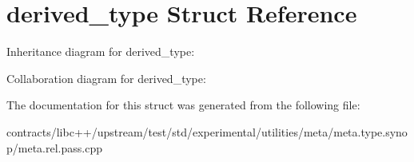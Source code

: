 \hypertarget{structderived__type}{}\section{derived\+\_\+type Struct Reference}
\label{structderived__type}


Inheritance diagram for derived\+\_\+type\+:


Collaboration diagram for derived\+\_\+type\+:


The documentation for this struct was generated from the following file\+:\begin{DoxyCompactItemize}
\item 
contracts/libc++/upstream/test/std/experimental/utilities/meta/meta.\+type.\+synop/meta.\+rel.\+pass.\+cpp\end{DoxyCompactItemize}
